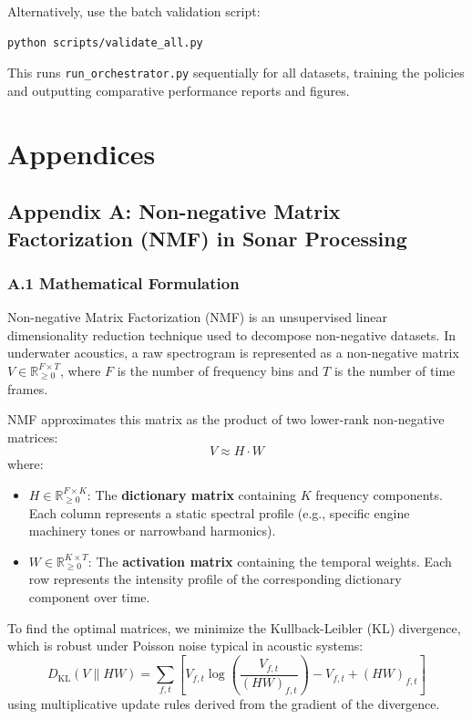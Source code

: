 \documentclass[12pt,a4paper]{article}
\begin{document}
Alternatively, use the batch validation script:
\begin{lstlisting}[language=bash]
python scripts/validate_all.py
\end{lstlisting}
This runs \texttt{run\_orchestrator.py} sequentially for all datasets, training the policies and outputting comparative performance reports and figures.

\section{Appendices}

\subsection{Appendix A: Non-negative Matrix Factorization (NMF) in Sonar Processing}

\subsubsection{A.1 Mathematical Formulation}
Non-negative Matrix Factorization (NMF) is an unsupervised linear dimensionality reduction technique used to decompose non-negative datasets. In underwater acoustics, a raw spectrogram is represented as a non-negative matrix $V \in \mathbb{R}^{F \times T}_{\ge 0}$, where $F$ is the number of frequency bins and $T$ is the number of time frames. 

NMF approximates this matrix as the product of two lower-rank non-negative matrices:
\begin{equation}
    V \approx H \cdot W
\end{equation}
where:
\begin{itemize}
    \item $H \in \mathbb{R}^{F \times K}_{\ge 0}$: The \textbf{dictionary matrix} containing $K$ frequency components. Each column represents a static spectral profile (e.g., specific engine machinery tones or narrowband harmonics).
    \item $W \in \mathbb{R}^{K \times T}_{\ge 0}$: The \textbf{activation matrix} containing the temporal weights. Each row represents the intensity profile of the corresponding dictionary component over time.
\end{itemize}

To find the optimal matrices, we minimize the Kullback-Leibler (KL) divergence, which is robust under Poisson noise typical in acoustic systems:
\begin{equation}
    D_{\text{KL}}(V \parallel HW) = \sum_{f,t} \left[ V_{f,t} \log\left( \frac{V_{f,t}}{(HW)_{f,t}} \right) - V_{f,t} + (HW)_{f,t} \right]
\end{equation}
using multiplicative update rules derived from the gradient of the divergence.
\end{document}
